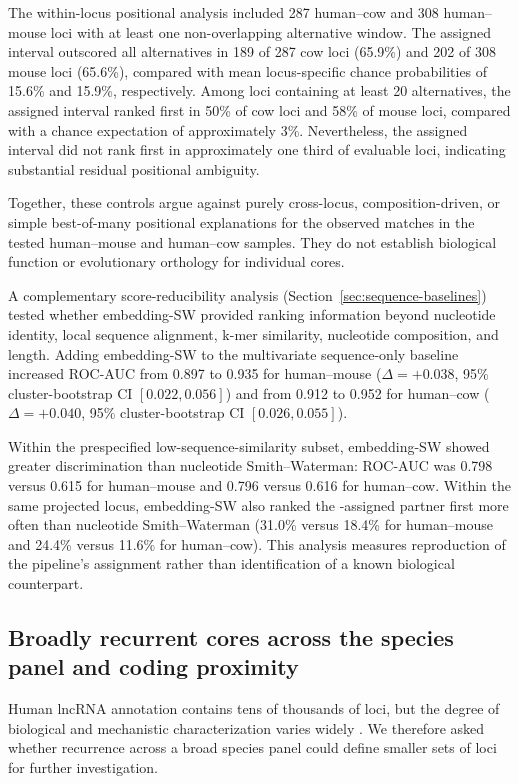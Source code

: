 The within-locus positional analysis included 287 human--cow and 308
human--mouse loci with at least one non-overlapping alternative window. The
assigned interval outscored all alternatives in 189 of 287 cow loci (65.9\%)
and 202 of 308 mouse loci (65.6\%), compared with mean locus-specific chance
probabilities of 15.6\% and 15.9\%, respectively. Among loci containing at least
20 alternatives, the assigned interval ranked first in 50\% of cow loci and
58\% of mouse loci, compared with a chance expectation of approximately 3\%.
Nevertheless, the assigned interval did not rank first in approximately one
third of evaluable loci, indicating substantial residual positional ambiguity.

Together, these controls argue against purely cross-locus, composition-driven,
or simple best-of-many positional explanations for the observed matches in the
tested human--mouse and human--cow samples. They do not establish biological
function or evolutionary orthology for individual cores.

A complementary score-reducibility analysis
(Section~\ref{sec:sequence-baselines}) tested whether embedding-SW provided
ranking information beyond nucleotide identity, local sequence alignment,
k-mer similarity, nucleotide composition, and length. Adding embedding-SW to
the multivariate sequence-only baseline increased ROC-AUC from 0.897 to 0.935
for human--mouse
($\Delta=+0.038$, 95\% cluster-bootstrap CI $[0.022,0.056]$)
and from 0.912 to 0.952 for human--cow
($\Delta=+0.040$, 95\% cluster-bootstrap CI $[0.026,0.055]$).

Within the prespecified low-sequence-similarity subset, embedding-SW showed
greater discrimination than nucleotide Smith--Waterman: ROC-AUC was 0.798
versus 0.615 for human--mouse and 0.796 versus 0.616 for human--cow.
Within the same projected locus, embedding-SW also ranked the
\curia{}-assigned partner first more often than nucleotide Smith--Waterman
(31.0\% versus 18.4\% for human--mouse and 24.4\% versus 11.6\% for
human--cow). This analysis measures reproduction of the pipeline's assignment
rather than identification of a known biological counterpart.

\subsection{Broadly recurrent cores across the species panel and coding proximity}

Human lncRNA annotation contains tens of thousands of loci, but the degree of
biological and mechanistic characterization varies widely
\citep{statelloGeneRegulationLong2021,mattickLongNoncodingRNAs2023}.
We therefore asked whether recurrence across a broad species panel could define
smaller sets of loci for further investigation.


